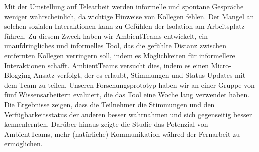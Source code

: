 \documentclass{seal_thesis}
\begin{document}
\begin{zusammenfassung}
    Mit der Umstellung auf Telearbeit werden informelle und spontane Gespräche weniger wahrscheinlich, da wichtige Hinweise von Kollegen fehlen. Der Mangel an solchen sozialen Interaktionen kann zu Gefühlen der Isolation am Arbeitsplatz führen. Zu diesem Zweck haben wir AmbientTeams entwickelt, ein unaufdringliches und informelles Tool, das die gefühlte Distanz zwischen entfernten Kollegen verringern soll, indem es Möglichkeiten für informellere Interaktionen schafft. AmbientTeams versucht dies, indem es einen Micro-Blogging-Ansatz verfolgt, der es erlaubt, Stimmungen und Status-Updates mit dem Team zu teilen. Unseren Forschungsprototyp haben wir an einer Gruppe von fünf Wissensarbeitern evaluiert, die das Tool eine Woche lang verwendet haben. Die Ergebnisse zeigen, dass die Teilnehmer die Stimmungen und den Verfügbarkeitsstatus der anderen besser wahrnahmen und sich gegenseitig besser kennenlernten. Darüber hinaus zeigte die Studie das Potenzial von AmbientTeams, mehr (natürliche) Kommunikation währed der Fernarbeit zu ermöglichen.
\end{zusammenfassung}

\setcounter{tocdepth}{1}
\tableofcontents
\listoffigures
\listoftables

\mainmatter









\begin{appendices}
    
\end{appendices}


\backmatter
\printbibliography
\end{document}
